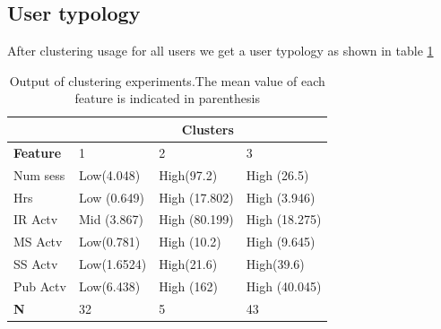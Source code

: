 \documentclass{acm_proc_article-sp}
\begin{document}

\subsection{User typology}

After clustering usage for all users we get a user typology as shown in table \ref{usertypology}
\begin{table}
\caption{Output of clustering experiments.The mean value of each feature is indicated in parenthesis}
\label{usertypology}
\begin{tabular}{|p{1.5cm}|p{1.5cm}|p{1.5cm}|p{1.5cm}|}
& \multicolumn{2}{r}{\textbf{Clusters}}  \\ \hline
 \textbf{Feature} & 1 &  2 & 3 \\ 
\hline Num sess & Low(4.048)& High(97.2)  & High (26.5)  \\ 
\hline Hrs & Low (0.649) & High (17.802) & High (3.946)  \\ 
\hline IR Actv & Mid (3.867) & High (80.199) & High (18.275) \\ 
\hline MS Actv &  Low(0.781)  & High (10.2) & High (9.645)  \\ 
\hline SS Actv  & Low(1.6524) & High(21.6) & High(39.6) \\
\hline Pub Actv & Low(6.438) & High (162) & High (40.045)  \\
\hline \textbf{N} & 32 & 5 & 43

\end{tabular}
\end{table} 
\end{document}

